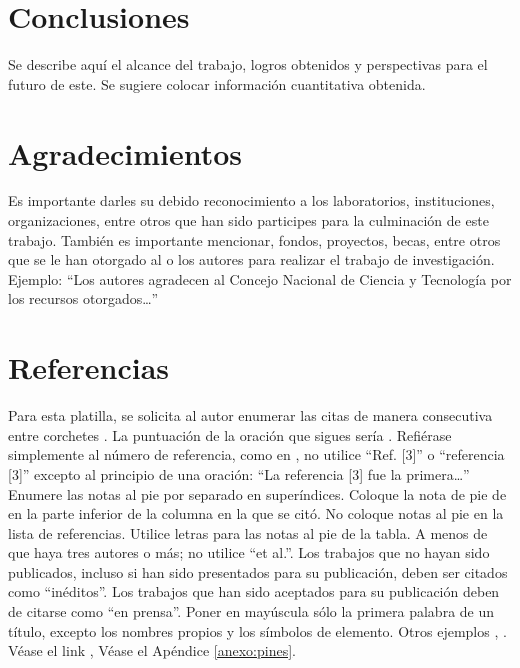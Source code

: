     \section{Conclusiones}
    
    Se describe aquí el alcance del trabajo, logros obtenidos y perspectivas para el futuro de este. Se sugiere colocar información cuantitativa obtenida.
    
    \section{Agradecimientos}
    
    Es importante darles su debido reconocimiento a los laboratorios, instituciones, organizaciones, entre otros que han sido participes para la culminación de este trabajo. También es importante mencionar, fondos, proyectos, becas, entre otros que se le han otorgado al o los autores para realizar el trabajo de investigación. Ejemplo: “Los autores agradecen al Concejo Nacional de Ciencia y Tecnología por los recursos otorgados…”
    
    \section*{Referencias}
    
    Para esta platilla, se solicita al autor enumerar las citas de manera consecutiva entre corchetes \cite{YLi2013}. 
    La puntuación de la oración que sigues sería \cite{Mesaelides2011}. 
    Refiérase simplemente al número de referencia, como en \cite{Morales2012}, no utilice “Ref. [3]” o “referencia [3]” excepto al principio de una oración: “La referencia [3] fue la primera…”
    Enumere las notas al pie por separado en superíndices. Coloque la nota de pie de en la parte inferior de la columna en la que se citó. No coloque notas al pie en la lista de referencias. Utilice letras para las notas al pie de la tabla.
    A menos de que haya tres autores o más; no utilice “et al.”. Los trabajos que no hayan sido publicados, incluso si han sido presentados para su publicación, deben ser citados como “inéditos”. Los trabajos que han sido aceptados para su publicación deben de citarse como “en prensa”. Poner en mayúscula sólo la primera palabra de un título, excepto los nombres propios y los símbolos de elemento. 
    Otros ejemplos \cite{LAAngeles2021}, \cite{LAAngelesConni}. 
    Véase el link \cite{prueba}, Véase el Apéndice \ref{anexo:pines}.
    
    
